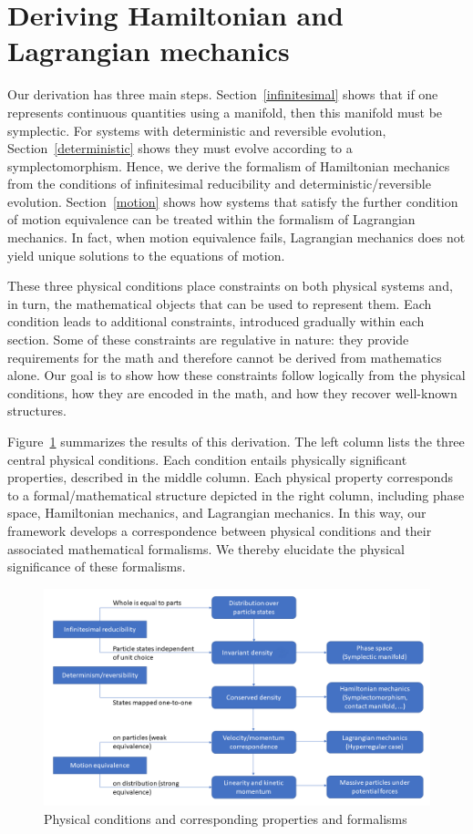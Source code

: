 \documentclass[12pt, twoside]{article}
\begin{document}
\section{Deriving Hamiltonian and Lagrangian mechanics}
\label{derivation}

Our derivation has three main steps. Section~\ref{infinitesimal} shows that if one represents continuous quantities using a manifold, then this manifold must be symplectic. For systems with deterministic and reversible evolution, Section~\ref{deterministic} shows they must evolve according to a symplectomorphism. Hence, we derive the formalism of Hamiltonian mechanics from the conditions of infinitesimal reducibility and deterministic/reversible evolution. Section~\ref{motion} shows how systems that satisfy the further condition of motion equivalence can be treated within the formalism of Lagrangian mechanics. In fact, when motion equivalence fails, Lagrangian mechanics does not yield unique solutions to the equations of motion.

These three physical conditions place constraints on both physical systems and, in turn, the mathematical objects that can be used to represent them. Each condition leads to additional constraints, introduced gradually within each section.  Some of these constraints are regulative in nature: they provide requirements for the math and therefore cannot be derived from mathematics alone. Our goal is to show how these constraints follow logically from the physical conditions, how they are encoded in the math, and how they recover well-known structures.

Figure~\ref{diagram} summarizes the results of this derivation. The left column lists the three central physical conditions. Each condition entails physically significant properties, described in the middle column. Each physical property corresponds to a formal/mathematical structure depicted in the right column, including phase space, Hamiltonian mechanics, and Lagrangian mechanics. In this way, our framework develops a correspondence between physical conditions and their associated mathematical formalisms. We thereby elucidate the physical significance of these formalisms.

\begin{figure}[h]
	\centering
	\includegraphics[width=\textwidth]{Diagram.png}
\caption{Physical conditions and corresponding properties and formalisms}
\label{diagram}
\end{figure}
\end{document}
